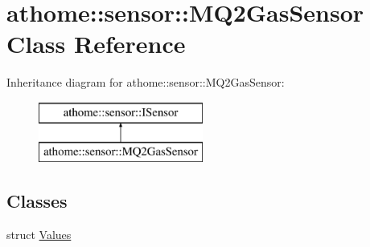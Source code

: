 \hypertarget{classathome_1_1sensor_1_1_m_q2_gas_sensor}{}\section{athome\+:\+:sensor\+:\+:M\+Q2\+Gas\+Sensor Class Reference}
\label{classathome_1_1sensor_1_1_m_q2_gas_sensor}
Inheritance diagram for athome\+:\+:sensor\+:\+:M\+Q2\+Gas\+Sensor\+:\begin{figure}[H]
\begin{center}
\leavevmode
\includegraphics[height=2.000000cm]{classathome_1_1sensor_1_1_m_q2_gas_sensor}
\end{center}
\end{figure}
\subsection*{Classes}
\begin{DoxyCompactItemize}
\item 
struct \mbox{\hyperlink{structathome_1_1sensor_1_1_m_q2_gas_sensor_1_1_values}{Values}}
\end{DoxyCompactItemize}
